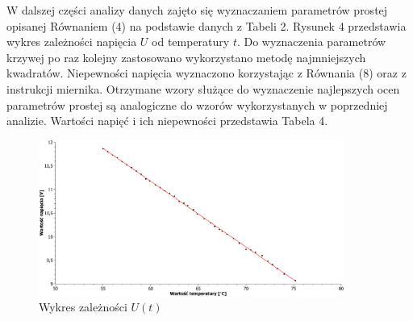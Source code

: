 \documentclass[10pt,a4paper]{article}
\begin{document}
W dalszej części analizy danych zajęto się wyznaczaniem parametrów prostej opisanej Równaniem (4) na podstawie danych z Tabeli 2. Rysunek 4 przedstawia wykres zależności napięcia $U$ od temperatury $t$. Do wyznaczenia parametrów krzywej po raz kolejny zastosowano wykorzystano metodę najmniejszych kwadratów. Niepewności napięcia wyznaczono korzystając z Równania (8) oraz z instrukcji miernika. Otrzymane wzory służące do wyznaczenie najlepszych ocen parametrów prostej są analogiczne do wzorów wykorzystanych w poprzedniej analizie. Wartości napięć i ich niepewności przedstawia Tabela 4. 

\begin{figure}[h!]
\includegraphics[width=10cm]{rys4.pdf} 
\centering
\caption{Wykres zależności $U(t)$}
\end{figure}
\end{document}

